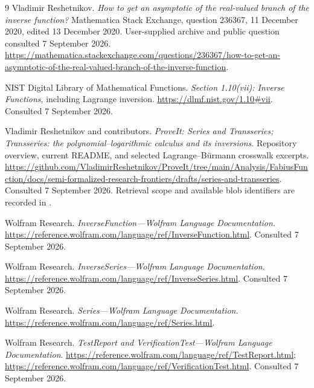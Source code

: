 \documentclass[11pt,a4paper]{article}
\numberwithin{equation}{section}
\theoremstyle{definition}\newtheorem{definition}[theorem]{Definition}
\theoremstyle{remark}\newtheorem{remark}[theorem]{Remark}
\newcommand{\code}[1]{\texttt{\detokenize{#1}}}
\begin{document}
\begin{thebibliography}{9}
Vladimir Reshetnikov.
\emph{How to get an asymptotic of the real-valued branch of the inverse function?}
Mathematica Stack Exchange, question 236367, 11 December 2020, edited 13 December 2020.
User-supplied archive and public question consulted 7 September 2026.
\url{https://mathematica.stackexchange.com/questions/236367/how-to-get-an-asymptotic-of-the-real-valued-branch-of-the-inverse-function}.

NIST Digital Library of Mathematical Functions.
\emph{Section 1.10(vii): Inverse Functions}, including Lagrange inversion.
\url{https://dlmf.nist.gov/1.10#vii}.
Consulted 7 September 2026.

Vladimir Reshetnikov and contributors.
\emph{ProveIt: Series and Transseries; Transseries: the polynomial--logarithmic calculus and its inversions}.
Repository overview, current README, and selected Lagrange--B\"urmann crosswalk excerpts.
\url{https://github.com/VladimirReshetnikov/ProveIt/tree/main/Analysis/FabiusFunction/docs/semi-formalized-research-frontiers/drafts/series-and-transseries}.
Consulted 7 September 2026. Retrieval scope and available blob identifiers are recorded in \code{SOURCES.md}.

Wolfram Research. \emph{InverseFunction---Wolfram Language Documentation}.
\url{https://reference.wolfram.com/language/ref/InverseFunction.html}.
Consulted 7 September 2026.

Wolfram Research. \emph{InverseSeries---Wolfram Language Documentation}.
\url{https://reference.wolfram.com/language/ref/InverseSeries.html}.
Consulted 7 September 2026.

Wolfram Research. \emph{Series---Wolfram Language Documentation}.
\url{https://reference.wolfram.com/language/ref/Series.html}.

Wolfram Research. \emph{TestReport and VerificationTest---Wolfram Language Documentation}.
\url{https://reference.wolfram.com/language/ref/TestReport.html};
\url{https://reference.wolfram.com/language/ref/VerificationTest.html}.
Consulted 7 September 2026.
\end{thebibliography}
\end{document}
